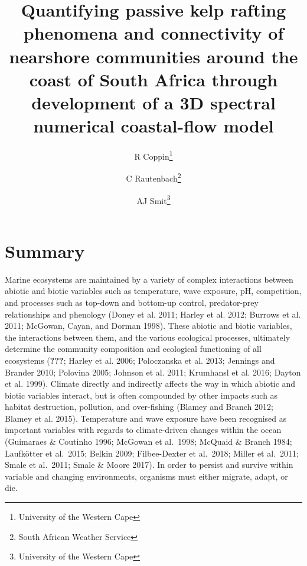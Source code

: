 \documentclass[
]{article}
\title{Quantifying passive kelp rafting phenomena and connectivity of nearshore
communities around the coast of South Africa through development of a 3D
spectral numerical coastal-flow model}
\author{R Coppin\footnote{University of the Western Cape} \and C Rautenbach\footnote{South African Weather Service} \and AJ Smit\footnote{University of the Western Cape}}
\date{}
\begin{document}
\maketitle

{
\setcounter{tocdepth}{2}
\tableofcontents
}
\hypertarget{summary}{%
\section{Summary}\label{summary}}

Marine ecosystems are maintained by a variety of complex interactions
between abiotic and biotic variables such as temperature, wave exposure,
pH, competition, and processes such as top-down and bottom-up control,
predator-prey relationships and phenology (Doney et al. 2011; Harley et
al. 2012; Burrows et al. 2011; McGowan, Cayan, and Dorman 1998). These
abiotic and biotic variables, the interactions between them, and the
various ecological processes, ultimately determine the community
composition and ecological functioning of all ecosystems
({\textbf{???}}; Harley et al. 2006; Poloczanska et al. 2013; Jennings
and Brander 2010; Polovina 2005; Johnson et al. 2011; Krumhansl et al.
2016; Dayton et al. 1999). Climate directly and indirectly affects the
way in which abiotic and biotic variables interact, but is often
compounded by other impacts such as habitat destruction, pollution, and
over-fishing (Blamey and Branch 2012; Blamey et al. 2015). Temperature
and wave exposure have been recognised as important variables with
regards to climate-driven changes within the ocean (Guimaraes \&
Coutinho 1996; McGowan et al.~1998; McQuaid \& Branch 1984; Laufkötter
et al.~2015; Belkin 2009; Filbee-Dexter et al.~2018; Miller et al.~2011;
Smale et al.~2011; Smale \& Moore 2017). In order to persist and survive
within variable and changing environments, organisms must either
migrate, adapt, or die.
\end{document}
